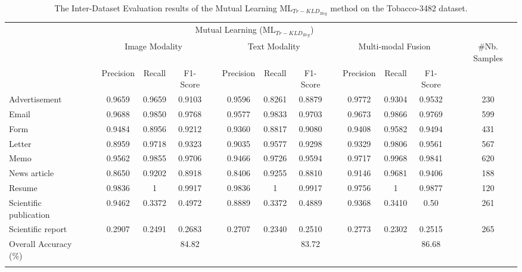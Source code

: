 \documentclass[twocolumn]{svjour3}
\begin{document}
\setlength\tabcolsep{3.8 pt}
\begin{table*}[tbh]
\small
\centering
\caption{The Inter-Dataset Evaluation results of the Mutual Learning ML$_{{Tr-KLD}_{Reg}}$ method on the Tobacco-3482 dataset.}
\resizebox{\textwidth}{!} {\begin{tabular}{lcccccccccccccc}
    \hline\noalign{\smallskip}
     \multicolumn{1}{c}{} && \multicolumn{10}{c}{Mutual Learning (ML$_{{Tr-KLD}_{Reg}}$)} \\
         \noalign{\smallskip}\hline\noalign{\smallskip}
         \multicolumn{1}{c}{Class Labels} && \multicolumn{3}{c}{Image Modality} && \multicolumn{3}{c}{Text Modality} && \multicolumn{3}{c}{Multi-modal Fusion} && \multicolumn{1}{c}{\#Nb. Samples}\\
         \noalign{\smallskip}\hline\noalign{\smallskip}
          && Precision & Recall & F1-Score &&  Precision & Recall & F1-Score && Precision & Recall & F1-Score &&  \\
         \cmidrule{3-13}Advertisement 
         && 0.9659 & 0.9659 & 0.9103
         && 0.9596 & 0.8261 & 0.8879 
         && 0.9772 & 0.9304 & 0.9532 
         && 230 \\
         Email 
         && 0.9688 & 0.9850 & 0.9768 
         && 0.9577 & 0.9833 & 0.9703
         && 0.9673 & 0.9866 & 0.9769 
         && 599 \\
         Form 
         && 0.9484 & 0.8956 & 0.9212 
         && 0.9360 & 0.8817 & 0.9080
         && 0.9408 & 0.9582 & 0.9494 
         && 431 \\
         Letter 
         && 0.8959 & 0.9718 & 0.9323
         && 0.9035 & 0.9577 & 0.9298 
         && 0.9329 & 0.9806 & 0.9561 
         && 567 \\
         Memo 
         && 0.9562 & 0.9855 & 0.9706
         && 0.9466 & 0.9726 & 0.9594
         && 0.9717 & 0.9968 & 0.9841 
         && 620 \\
         News article 
         && 0.8650 & 0.9202 & 0.8918
         && 0.8406 & 0.9255 & 0.8810
         && 0.9146 & 0.9681 & 0.9406 
         && 188 \\
         Resume 
         && 0.9836 & 1 & 0.9917
         && 0.9836 & 1 & 0.9917
         && 0.9756 & 1 & 0.9877 
         && 120 \\
         Scientific publication 
         && 0.9462 & 0.3372 & 0.4972
         && 0.8889 & 0.3372 & 0.4889
         && 0.9368 & 0.3410 & 0.50 
         && 261 \\
         Scientific report 
         && 0.2907 & 0.2491 & 0.2683 
         && 0.2707 & 0.2340 & 0.2510 
         && 0.2773 & 0.2302 & 0.2515 
         && 265 \\
    \noalign{\smallskip}\hline\noalign{\smallskip}
        Overall Accuracy (\%) && & & 84.82 &&  &  & 83.72 &&  &  & 86.68 \\
    \noalign{\smallskip}\hline
    
    \end{tabular}}
    \label{tab:Evaluation of PML on tobacco}
\end{table*}
\end{document}
